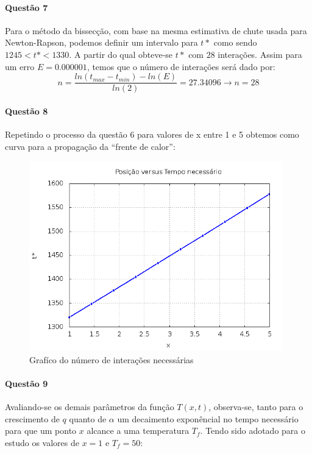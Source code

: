 \documentclass[a4paper,11pt]{article}
\begin{document}
\paragraph{Questão 7}Para o método da bissecção, com base na mesma estimativa de chute usada para Newton-Rapson, podemos definir um intervalo para $t*$ como sendo $1245<t*<1330$. A partir do qual obteve-se $t*$ com $28$ interações. Assim para um erro  $E = 0.000001$, temos que o número de interações será dado por:
\begin{equation}
n = \frac{ln(t_{max} - t_{min}) -ln (E)}{ln(2)} = 27.34096 \rightarrow n = 28
\end{equation}

\paragraph{Questão 8}Repetindo o processo da questão 6 para valores de x entre 1 e 5 obtemos como curva para a propagação da ``frente de calor'':
\begin{figure}[H]
\includegraphics[width=11cm]{../image/questao8.png}
\centering
\caption{Grafíco do número de interações necessárias}
\end{figure}

\paragraph{Questão 9}Avaliando-se os demais parâmetros da função $T(x,t)$, observa-se, tanto para o crescimento de $q$ quanto de $\alpha$ um decaimento exponêncial no tempo necessário para que um ponto $x$ alcance a uma temperatura $T_f$. Tendo sido adotado para o estudo os valores de $x=1$ e $T_f=50$:
\end{document}
